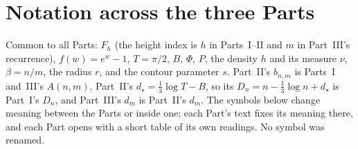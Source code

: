 \documentclass[11pt,letterpaper]{article}
\theoremstyle{remark}\newtheorem{remark}[theorem]{Remark}
\begin{document}
\section*{Notation across the three Parts}\label{ied:sec:notation}
Common to all Parts: $F_h$ (the height index is $h$ in Parts~I--II and $m$ in Part~III's recurrence), $f(w)=e^w-1$, $T=\pi/2$, $B$, $\Phi$, $P$, the density $h$ and its measure $\nu$, $\beta=n/m$, the radius $r$, and the contour parameter $s$. Part~II's $b_{n,m}$ is Parts~I and~III's $A(n,m)$. Part~II's $d_\star=\frac13\log T-B$, so its $D_n=n-\frac13\log n+d_\star$ is Part~I's $D_n$, and Part~III's $d_m$ is Part~II's $d_m$. The symbols below change meaning between the Parts or inside one; each Part's text fixes its meaning there, and each Part opens with a short table of its own readings. No symbol was renamed.
\begingroup\small
\renewcommand{\theHtable}{ied-notation.\arabic{table}}%
\end{document}
